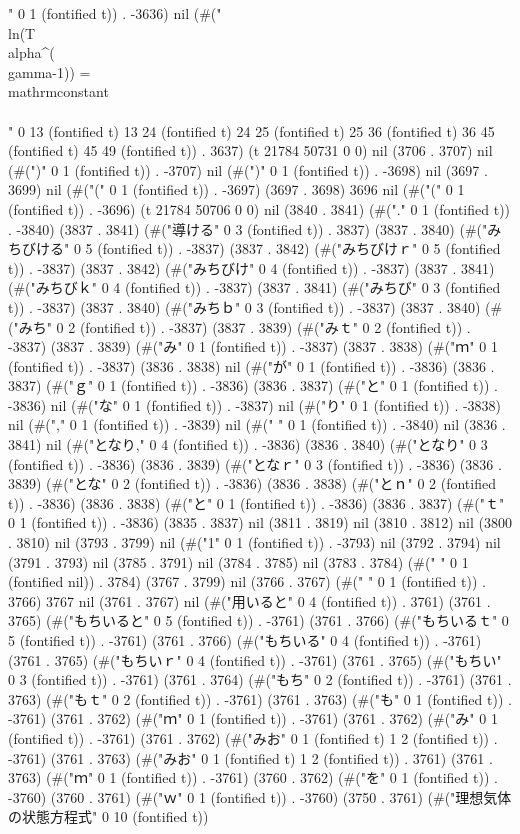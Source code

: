 " 0 1 (fontified t)) . -3636) nil (#(" \\ln(T\\alpha^{(\\gamma-1)}) = \\mathrm{constant} \\\\" 0 13 (fontified t) 13 24 (fontified t) 24 25 (fontified t) 25 36 (fontified t) 36 45 (fontified t) 45 49 (fontified t)) . 3637) (t 21784 50731 0 0) nil (3706 . 3707) nil (#(")" 0 1 (fontified t)) . -3707) nil (#(")" 0 1 (fontified t)) . -3698) nil (3697 . 3699) nil (#("(" 0 1 (fontified t)) . -3697) (3697 . 3698) 3696 nil (#("(" 0 1 (fontified t)) . -3696) (t 21784 50706 0 0) nil (3840 . 3841) (#("." 0 1 (fontified t)) . -3840) (3837 . 3841) (#("導ける" 0 3 (fontified t)) . 3837) (3837 . 3840) (#("みちびける" 0 5 (fontified t)) . -3837) (3837 . 3842) (#("みちびけｒ" 0 5 (fontified t)) . -3837) (3837 . 3842) (#("みちびけ" 0 4 (fontified t)) . -3837) (3837 . 3841) (#("みちびｋ" 0 4 (fontified t)) . -3837) (3837 . 3841) (#("みちび" 0 3 (fontified t)) . -3837) (3837 . 3840) (#("みちｂ" 0 3 (fontified t)) . -3837) (3837 . 3840) (#("みち" 0 2 (fontified t)) . -3837) (3837 . 3839) (#("みｔ" 0 2 (fontified t)) . -3837) (3837 . 3839) (#("み" 0 1 (fontified t)) . -3837) (3837 . 3838) (#("ｍ" 0 1 (fontified t)) . -3837) (3836 . 3838) nil (#("が" 0 1 (fontified t)) . -3836) (3836 . 3837) (#("ｇ" 0 1 (fontified t)) . -3836) (3836 . 3837) (#("と" 0 1 (fontified t)) . -3836) nil (#("な" 0 1 (fontified t)) . -3837) nil (#("り" 0 1 (fontified t)) . -3838) nil (#("," 0 1 (fontified t)) . -3839) nil (#(" " 0 1 (fontified t)) . -3840) nil (3836 . 3841) nil (#("となり," 0 4 (fontified t)) . -3836) (3836 . 3840) (#("となり" 0 3 (fontified t)) . -3836) (3836 . 3839) (#("となｒ" 0 3 (fontified t)) . -3836) (3836 . 3839) (#("とな" 0 2 (fontified t)) . -3836) (3836 . 3838) (#("とｎ" 0 2 (fontified t)) . -3836) (3836 . 3838) (#("と" 0 1 (fontified t)) . -3836) (3836 . 3837) (#("ｔ" 0 1 (fontified t)) . -3836) (3835 . 3837) nil (3811 . 3819) nil (3810 . 3812) nil (3800 . 3810) nil (3793 . 3799) nil (#("1" 0 1 (fontified t)) . -3793) nil (3792 . 3794) nil (3791 . 3793) nil (3785 . 3791) nil (3784 . 3785) nil (3783 . 3784) (#(" " 0 1 (fontified nil)) . 3784) (3767 . 3799) nil (3766 . 3767) (#(" " 0 1 (fontified t)) . 3766) 3767 nil (3761 . 3767) nil (#("用いると" 0 4 (fontified t)) . 3761) (3761 . 3765) (#("もちいると" 0 5 (fontified t)) . -3761) (3761 . 3766) (#("もちいるｔ" 0 5 (fontified t)) . -3761) (3761 . 3766) (#("もちいる" 0 4 (fontified t)) . -3761) (3761 . 3765) (#("もちいｒ" 0 4 (fontified t)) . -3761) (3761 . 3765) (#("もちい" 0 3 (fontified t)) . -3761) (3761 . 3764) (#("もち" 0 2 (fontified t)) . -3761) (3761 . 3763) (#("もｔ" 0 2 (fontified t)) . -3761) (3761 . 3763) (#("も" 0 1 (fontified t)) . -3761) (3761 . 3762) (#("ｍ" 0 1 (fontified t)) . -3761) (3761 . 3762) (#("み" 0 1 (fontified t)) . -3761) (3761 . 3762) (#("みお" 0 1 (fontified t) 1 2 (fontified t)) . -3761) (3761 . 3763) (#("みお" 0 1 (fontified t) 1 2 (fontified t)) . 3761) (3761 . 3763) (#("ｍ" 0 1 (fontified t)) . -3761) (3760 . 3762) (#("を" 0 1 (fontified t)) . -3760) (3760 . 3761) (#("ｗ" 0 1 (fontified t)) . -3760) (3750 . 3761) (#("理想気体の状態方程式" 0 10 (fontified t)) 